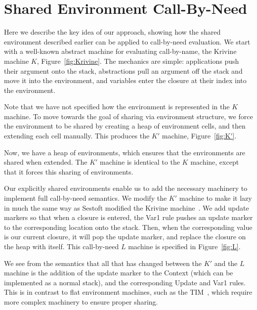 \documentclass[preprint]{sigplanconf}
\begin{document}
\section{Shared Environment Call-By-Need} \label{sec:calc}

Here we describe the key idea of our approach, showing how
the shared environment described earlier can be applied to call-by-need
evaluation. We start with a well-known abstract machine for evaluating
call-by-name, the Krivine machine $K$, Figure~\ref{fig:Krivine}.
The mechanics are simple: applications push their argument onto the stack,
abstractions pull an argument off the stack and move it into the environment,
and variables enter the closure at their index into the environment.



Note that we have not specified how the environment is represented in the $K$
machine. To move towards the goal of sharing via environment structure,
we force the environment to be shared by creating a heap of environment
cells, and then extending each cell manually. This produces the $K'$ machine,
Figure~\ref{fig:K'}.



Now, we have a heap of environments, which ensures that the
environments are shared when extended.  The $K'$ machine is identical to the $K$
machine, except that it forces this sharing of environments. 

Our explicitly shared environments enable us to add the necessary
machinery to implement full call-by-need semantics. We modify the $K'$ machine
to make it lazy in much the same way as Sestoft modified the Krivine
machine~\cite{sestoft}. We add update markers so that when a closure is entered,
the Var1 rule pushes an update marker to the corresponding location onto the
stack.  Then, when the corresponding value is our current closure, it will pop
the update marker, and replace the closure on the heap with itself. This
call-by-need $L$ machine is specified in Figure~\ref{fig:L}.



We see from the semantics that all that has changed between the $K'$ and the
$L$ machine is the addition of the update marker to the Context
(which can be implemented as a normal stack), and the corresponding Update and
Var1 rules. This is in contrast to flat environment machines, such as the TIM~\cite{TIM}, which require more
complex machinery to ensure proper sharing.
\end{document}
